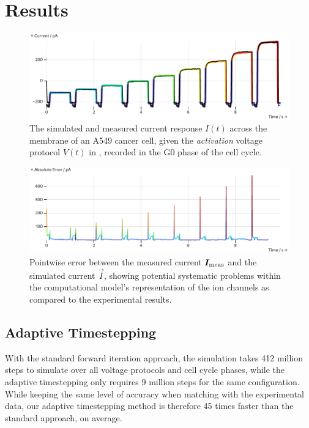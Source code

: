 \section{Results}
\begin{figure}[ht]
  \includegraphics[width=\columnwidth]{../figures/results/full-simulation-current.pdf}
  \caption{The simulated and measured current response $I(t)$ across the membrane of an A549 cancer cell, given the \textit{activation} voltage protocol $V(t)$ in , recorded in the G0 phase of the cell cycle.}
  \label{figure:full-simulation-current}
\end{figure}
\begin{figure}
  \includegraphics[width=\columnwidth]{../figures/results/simulation-error.pdf}
  \caption{Pointwise error between the measured current $\vec{I}_{\rm meas}$ and the simulated current $\vec{I}$, showing potential systematic problems within the computational model's representation of the ion channels as compared to the experimental results.}
  \label{figure:simulation-error}
\end{figure}

\subsection{Adaptive Timestepping}
With the standard forward iteration approach, the simulation takes 412 million steps to simulate over all voltage protocols and cell cycle phases, while the adaptive timestepping only requires 9 million steps for the same configuration.
While keeping the same level of accuracy when matching with the experimental data, our adaptive timestepping method is therefore 45 times faster than the standard approach, on average.

